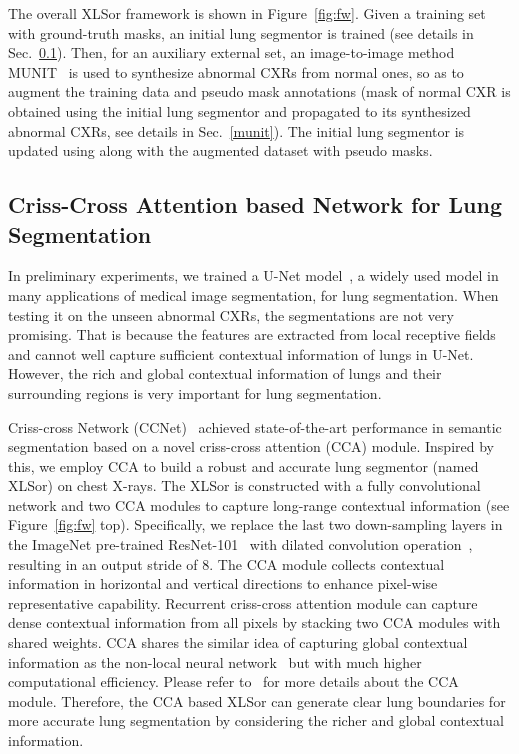 \documentclass{midl} \usepackage{multirow}
\begin{document}
The overall XLSor framework is shown in Figure~\ref{fig:fw}. Given a training set  with ground-truth masks, an initial lung segmentor is trained (see details in Sec.~\ref{ccnet}). Then, for an auxiliary external set, an image-to-image method MUNIT~\cite{munit} is used to synthesize abnormal CXRs from normal ones, so as to augment the training data and pseudo mask annotations (mask of normal CXR is obtained using the initial lung segmentor and propagated to its synthesized abnormal CXRs, see details in Sec.~\ref{munit}). The initial lung segmentor is updated using  along with the augmented dataset  with pseudo masks.

\subsection{Criss-Cross Attention based Network for Lung Segmentation}
\label{ccnet}

In preliminary experiments, we trained a U-Net model~\cite{U-net}, a widely used model in many applications of medical image segmentation, for lung segmentation. When testing it on the unseen abnormal CXRs, the segmentations are not very promising. That is because the features are extracted from local receptive fields and cannot well capture sufficient contextual information of lungs in U-Net. However, the rich and global contextual information of lungs and their surrounding regions is very important for lung segmentation.

Criss-cross Network (CCNet)~\cite{Huang2018CCNetCA} achieved state-of-the-art performance in semantic segmentation based on a novel criss-cross attention (CCA) module.
Inspired by this, we employ CCA to build a robust and accurate lung segmentor (named XLSor) on chest X-rays. The XLSor is constructed with a fully convolutional network and two CCA modules to capture long-range contextual information (see Figure~\ref{fig:fw} top). Specifically, we replace the last two down-sampling layers in the ImageNet pre-trained ResNet-101~\cite{resnet} with dilated convolution operation~\cite{deeplab}, resulting in an output stride of 8. The CCA module collects contextual
information in horizontal and vertical directions to enhance pixel-wise representative capability.
Recurrent criss-cross attention module can capture dense contextual information from all pixels by stacking two CCA modules with shared weights. CCA shares the similar idea of capturing global contextual information as the non-local neural network~\cite{nonlocal} but with much higher computational efficiency. Please refer to~\cite{Huang2018CCNetCA} for more details about the CCA module.
Therefore, the CCA based XLSor can generate clear lung boundaries for more accurate lung segmentation by considering the richer and global contextual information.
\end{document}
